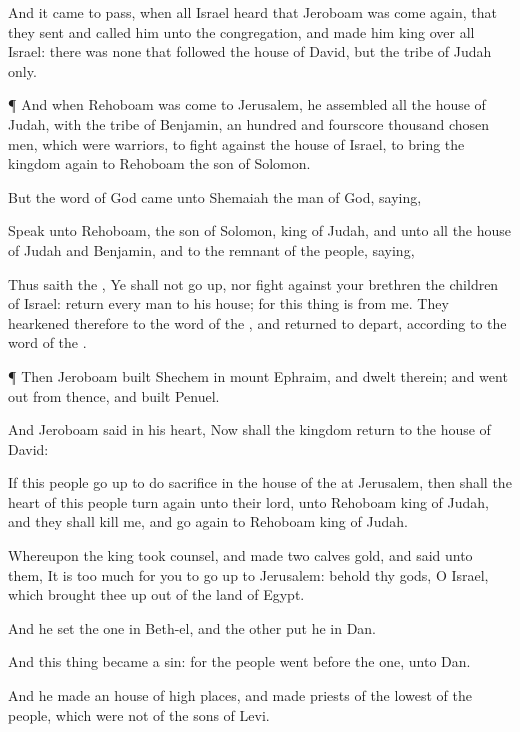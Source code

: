 {And it came to pass, when all
Israel
heard that
Jeroboam was come
again, that they
sent and
called him unto the
congregation, and made him
king over all
Israel: there was none that
followed the
house of
David,
but the
tribe of
Judah only.


\par }{\PP {}¶ And when
Rehoboam was
come to
Jerusalem, he
assembled all the
house of
Judah, with the
tribe of
Benjamin, an
hundred and
fourscore
thousand chosen
men, which were
warriors, to
fight against the
house of
Israel, to
bring the
kingdom
again to
Rehoboam the
son of
Solomon.

But the
word of
God came unto
Shemaiah the
man of
God,
saying,

Speak unto
Rehoboam, the
son of
Solomon,
king of
Judah, and unto all the
house of
Judah and
Benjamin, and to the
remnant of the
people,
saying,

Thus
saith the
{}, Ye shall not go
up, nor
fight against your
brethren the
children of
Israel:
return every
man to his
house; for this
thing
is from me. They
hearkened therefore to the
word of the
{}, and
returned to
depart, according to the
word of the
{}.


\par }{\PP {}¶ Then
Jeroboam
built
Shechem in
mount
Ephraim, and
dwelt therein; and went
out from thence, and
built
Penuel.

And
Jeroboam
said in his
heart, Now shall the
kingdom
return to the
house of
David:

If this
people go
up to
do
sacrifice in the
house of the
{} at
Jerusalem, then shall the
heart of this
people turn
again unto their
lord,
{} unto
Rehoboam
king of
Judah, and they shall
kill me, and go
again to
Rehoboam
king of
Judah.

Whereupon the
king took
counsel, and
made
two
calves
{}
gold, and
said unto them, It is too
much for you to go
up to
Jerusalem: behold thy
gods, O
Israel, which brought thee
up out of the
land of
Egypt.

And he
set the
one in
Beth-el, and the
other
put he in
Dan.

And this
thing became a
sin: for the
people
went
{}
before the
one,
{} unto
Dan.

And he
made an
house of high
places, and
made
priests of the
lowest of the
people, which were not of the
sons of
Levi.

}
